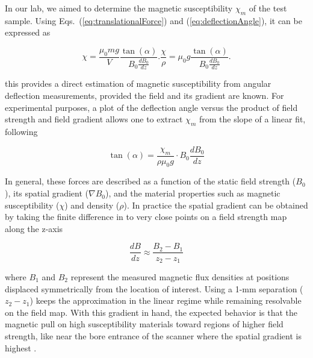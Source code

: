In our lab, we aimed to determine the magnetic susceptibility $\chi_m$ of the test sample. Using Eqs.~(\ref{eq:translationalForce}) and (\ref{eq:deflectionAngle}), it can be expressed as

\begin{subequations}
\begin{equation}
	\chi = \frac{\mu_0 m g}{V}\frac{\tan (\alpha)}{ B_0 \frac{dB_0}{dz}}.
	\label{eq:chi}
\end{equation}
\begin{equation}
	\frac{\chi}{\rho} = \mu_0 g\frac{\tan (\alpha)}{ B_0 \frac{dB_0}{dz}}.
	\label{eq:chi_rho}
\end{equation}
\label{eq:chis}
\end{subequations}

\noindent this provides a direct estimation of magnetic susceptibility from angular deflection measurements, provided the field and its gradient are known. For experimental purposes, a plot of the deflection angle versus the product of field strength and field gradient allows one to extract $\chi_m$ from the slope of a linear fit, following

\begin{equation}
	\boxed{\tan (\alpha) =   \frac{\chi_m }{\rho \mu_0 g}  \cdot B_0 \frac{dB_0}{dz}}
	\label{eq:forFit}
\end{equation}

In general, these forces are described as a function of the static field strength ($B_0$), its spatial gradient ($\nabla B_0$), and the material properties such as magnetic susceptibility ($\chi$) and density ($\rho$). In practice the spatial gradient can be obtained by taking the finite difference in to very close points on a field strength map along the z-axis

\begin{equation}
	\label{eq:finiteDiff}
	\frac{dB}{dz} \approx \frac{B_2 - B_1}{z_2 - z_1}
\end{equation}

\noindent where $B_1$ and $B_2$ represent the measured magnetic flux densities at positions displaced symmetrically from the location of interest. Using a 1-mm separation ($z_2 - z_1$) keeps the approximation in the linear regime while remaining resolvable on the field map. With this gradient in hand, the expected behavior is that the magnetic pull on high susceptibility materials toward regions of higher field strength, like near the bore entrance of the scanner where the spatial gradient is highest \cite{bushberg2011,aboyewa2021,panych2018}. 

